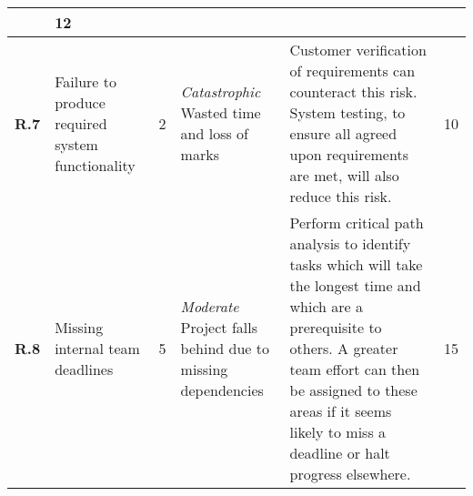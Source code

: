 \begin{longtable}[H]{| p{0.6cm} | p{2cm} | p{0.3cm} | p{2.6cm} | p{8.1cm} | p{0.7cm} |}
    & 12    \\ \hline
    \textbf{R.7}     & Failure to produce required system functionality & 2 & \textit{Catastrophic}
\newline Wasted time and loss of marks                        
    & Customer verification of requirements can counteract this risk. System testing, to ensure all agreed upon requirements are met, will also reduce this risk.                                                                                                                                                                                                                                                                                                                                                                                      
    & 10    \\ \hline
    \textbf{R.8}     & Missing internal team deadlines                  & 5            & \textit{Moderate}
\newline Project falls behind due to missing dependencies                     
    & Perform critical path analysis to identify tasks which will take the longest time and which are a prerequisite to others. A greater team effort can then be assigned to these areas if it seems likely to miss a deadline or halt progress elsewhere.                                           
    & 15    \\ \hline
\end{longtable}
